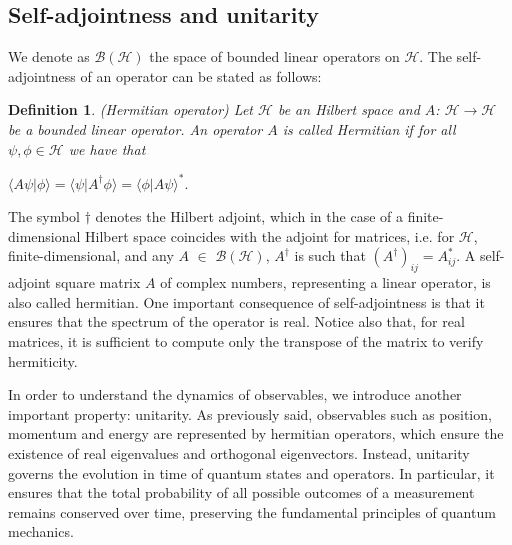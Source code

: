 \documentclass{Configuration_Files/PoliMi3i_thesis}
\newtheorem{definition}{Definition}[chapter]
\begin{document}
\subsection{Self-adjointness and unitarity}

We denote as $\mathscr{B}(\mathscr{H})$ the space of bounded linear operators on $\mathscr{H}$.
The self-adjointness of an operator can be stated as follows:

\begin{definition} (Hermitian operator) Let $\mathscr{H}$ be an Hilbert space and  $A$: $\mathscr{H} \rightarrow \mathscr{H}$ be a bounded linear operator. An operator $A$ is called Hermitian if for all $\psi,\phi \in \mathscr{H}$ we have that
\end{definition}

\begin{center}
	$\langle A\psi|\phi \rangle = \langle \psi|A^{\dagger}\phi \rangle = \langle \phi|A\psi \rangle^{*}$.
\end{center}

The symbol $\dagger$ denotes the Hilbert adjoint, which in the case of a finite-dimensional Hilbert space coincides with  the adjoint for matrices, i.e. for $\mathscr{H}$, finite-dimensional, and any $A$ $\in$ $\mathscr{B}(\mathscr{H})$, $A^{\dagger}$ is such that $(A^{\dagger})_{ij}=A_{ij}^*$. A self-adjoint square matrix $A$ of complex numbers, representing a linear operator, is also called hermitian. One important consequence of self-adjointness is that it ensures that the spectrum of the operator is real. Notice also that, for real matrices, it is sufficient to compute only the transpose of the matrix to verify hermiticity. \newline

In order to understand the dynamics of observables, we introduce another important property: unitarity. 
As previously said, observables such as position, momentum and energy are represented by hermitian operators, which ensure the existence of real eigenvalues and orthogonal eigenvectors. Instead, unitarity governs the evolution in time of quantum states and operators. In particular, it ensures that the total probability of all possible outcomes of a measurement remains conserved over time, preserving the fundamental principles of quantum mechanics. 
\end{document}

